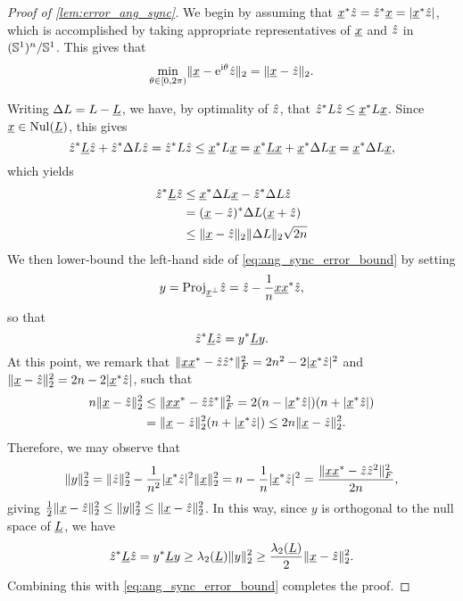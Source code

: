 \begin{proof}[Proof of \cref{lem:error_ang_sync}]
  We begin by assuming that $\underline{x}^* \hat{z} = \hat{z}^* \underline{x} = |\underline{x}^* \hat{z}|$, which is accomplished by taking appropriate representatives of $\underline{x}$ and $\hat{z}$ in $(\mathbb{S}^1)^n / \mathbb{S}^1$.  This gives that \[\min_{\theta \in [0, 2 \pi)} \lVert \underline{x} - \mathrm{e}^{\mathrm{i} \theta} \hat{z}\rVert_2 = \lVert \underline{x} - \hat{z}\rVert_2.\]

  Writing $\Delta L = L - \underline{L}$, we have, by optimality of $\hat{z}$, that $\hat{z}^* L \hat{z} \le \underline{x}^* L \underline{x}$.  Since $\underline{x} \in \operatorname{Nul}(\underline{L})$, this gives \[\hat{z}^* \underline{L} \hat{z} + \hat{z}^* \Delta L \hat{z} = \hat{z}^* L \hat{z} \le \underline{x}^* L \underline{x} = \underline{x}^* \underline{L} \underline{x} + \underline{x}^* \Delta L \underline{x} = \underline{x}^* \Delta L \underline{x},\] which yields \begin{equation} \begin{aligned} \hat{z}^* \underline{L} \hat{z} &\le \underline{x}^* \Delta L \underline{x} - \hat{z}^* \Delta L \hat{z} \\ &= (\underline{x} - \hat{z})^* \Delta L (\underline{x} + \hat{z}) \\ &\le \lVert \underline{x} - \hat{z}\rVert_2 \lVert \Delta L\rVert_2 \sqrt{2 n} \end{aligned} \label{eq:ang_sync_error_bound}\end{equation}  We then lower-bound the left-hand side of \eqref{eq:ang_sync_error_bound} by setting \[y = \mathrm{Proj}_{\underline{x}^\perp} \hat{z} = \hat{z} - \frac{1}{n} \underline{x} \underline{x}^* \hat{z},\] so that \[\hat{z}^* \underline{L} \hat{z} = y^* \underline{L} y.\]  At this point, we remark that $\lVert \underline{x} \underline{x}^* - \hat{z} \hat{z}^* \rVert_F^2 = 2n^2 - 2 |\underline{x}^* \hat{z}|^2$ and $\lVert \underline{x} - \hat{z}\rVert_2^2 = 2 n - 2|\underline{x}^* \hat{z}|$, such that \begin{align*} n \lVert \underline{x} - \hat{z}\rVert_2^2 &\le \lVert \underline{x} \underline{x}^* - \hat{z} \hat{z}^* \rVert_F^2 = 2 (n - |\underline{x}^* \hat{z}|) (n + |\underline{x}^* \hat{z}|) \\ &= \lVert \underline{x} - \hat{z}\rVert_2^2(n + |\underline{x}^* \hat{z}|) \le 2 n \lVert \underline{x} - \hat{z}\rVert_2^2. \end{align*}  Therefore, we may observe that \[\lVert y \rVert_2^2 = \lVert \hat{z} \rVert_2^2 - \frac{1}{n^2} |\underline{x}^* \hat{z}|^2 \lVert \underline{x} \rVert_2^2 = n - \frac{1}{n} |\underline{x}^* \hat{z}|^2 = \dfrac{\lVert \underline{x} \underline{x}^* - \hat{z} \hat{z}^2\rVert_F^2}{2 n},\] giving $\frac{1}{2} \lVert \underline{x} - \hat{z}\rVert_2^2 \le \lVert y \rVert_2^2 \le \lVert \underline{x} - \hat{z} \rVert_2^2$.  In this way, since $y$ is orthogonal to the null space of $\underline{L}$, we have \begin{equation} \hat{z}^* \underline{L} \hat{z} = y^* \underline{L} y \ge \lambda_2(\underline{L}) \lVert y \rVert_2^2 \ge \frac{\lambda_2(\underline{L})}{2} \lVert \underline{x} - \hat{z} \rVert_2^2. \label{eq:dist_quad}\end{equation}  Combining this with \eqref{eq:ang_sync_error_bound} completes the proof.
\end{proof}
